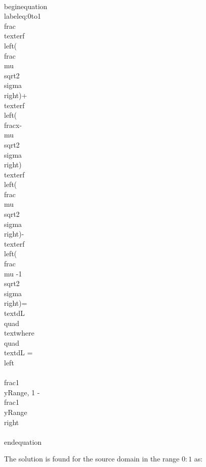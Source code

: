 \\begin{equation}\\label{eq:0to1}
 \\frac{\\text{erf}\\left(\\frac{\\mu }{\\sqrt{2} \\sigma }\\right)+\\text{erf}\\left(\\frac{x-\\mu }{\\sqrt{2} \\sigma }\\right)}{\\text{erf}\\left(\\frac{\\mu }{\\sqrt{2} \\sigma }\\right)-\\text{erf}\\left(\\frac{\\mu -1}{\\sqrt{2} \\sigma }\\right)}=\\text{dL} \\quad \\text{where} \\quad \\text{dL} = \\left\\{ \\frac{1}{\\yRange}, 1 - \\frac{1}{\\yRange} \\right\\}
\\end{equation}


The solution is found for the source domain in the range $0:1$ as:


